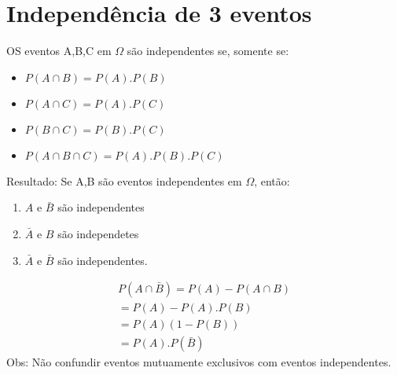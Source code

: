 \documentclass[11pt,a4paper]{article}
\begin{document}
\section{Independência de 3 eventos}
OS eventos A,B,C em $\Omega$ são independentes se, somente se:
\begin{itemize}
  \item $P(A \cap B) = P(A).P(B)$
  \item $P(A \cap C) = P(A).P(C)$
  \item $P(B \cap C)= P(B).P(C)$
  \item $P(A \cap B \cap C)= P(A).P(B).P(C)$
\end{itemize}
Resultado: Se A,B são eventos independentes em $\Omega$, então:
\begin{enumerate}
  \item $A$ e $\bar{B}$ são independentes
  \item $\bar{A}$ e $B$ são independetes
  \item $\bar{A}$ e $\bar{B}$ são independentes.
\end{enumerate}
\begin{figure}
  \label{fig:3}
\end{figure}

\begin{align}
  P(A \cap \bar{B})= P(A) - P(A \cap B)\\
  = P(A)-P(A).P(B)\\
  = P(A)(1-P(B))\\
  =P(A).P(\bar{B})
\end{align}
Obs: Não confundir eventos mutuamente exclusivos com eventos independentes.
\end{document}

